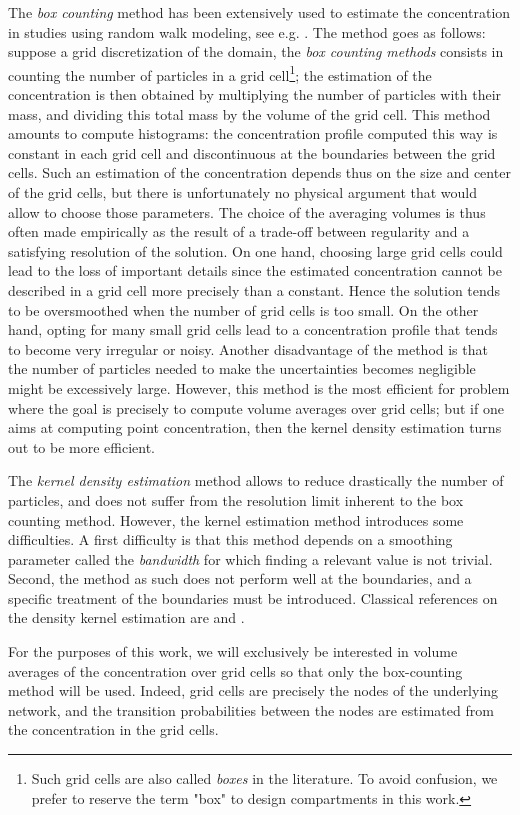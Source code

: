 The \textit{box counting} method has been extensively used to estimate the concentration in studies using random walk modeling, see e.g. \cite{riddle1998specification}. The method goes as follows: suppose a grid discretization of the domain, the \textit{box counting methods} consists in counting the number of particles in a grid cell\footnote{Such grid cells are also called \textit{boxes} in the literature. To avoid confusion, we prefer to reserve the term "box" to design compartments in this work.}; the estimation of the concentration is then obtained by multiplying the number of particles with their mass, and dividing this total mass by the volume of the grid cell. This method amounts to compute histograms: the concentration profile computed this way is constant in each grid cell and discontinuous at the boundaries between the grid cells. Such an estimation of the concentration depends thus on the size and center of the grid cells, but there is unfortunately no physical argument that would allow to choose those parameters. The choice of the averaging volumes is thus often made empirically as the result of a trade-off between regularity and a satisfying resolution of the solution. On one hand, choosing large grid cells could lead to the loss of important details since the estimated concentration cannot be described in a grid cell more precisely than a constant. Hence the solution tends to be oversmoothed when the number of grid cells is too small. On the other hand, opting for many small grid cells lead to a concentration profile that tends to become very irregular or noisy. Another disadvantage of the method is that the number of particles needed to make the uncertainties becomes negligible might be excessively large. However, this method is the most efficient for problem where the goal is precisely to compute volume averages over grid cells; but if one aims at computing point concentration, then the kernel density estimation turns out to be more efficient.

The \textit{kernel density estimation} method allows to reduce drastically the number of particles, and does not suffer from the resolution limit inherent to the box counting method. However, the kernel estimation method introduces some difficulties. A first difficulty is that this method depends on a smoothing parameter called the \textit{bandwidth} for which finding a relevant value is not trivial. Second, the method as such does not perform well at the boundaries, and a specific treatment of the boundaries must be introduced. Classical references on the density kernel estimation are \cite{silverman1986density} and \cite{wand1995kernel}.

For the purposes of this work, we will exclusively be interested in volume averages of the concentration over grid cells so that only the box-counting method will be used. Indeed, grid cells are precisely the nodes of the underlying network, and the transition probabilities between the nodes are estimated from the concentration in the grid cells.